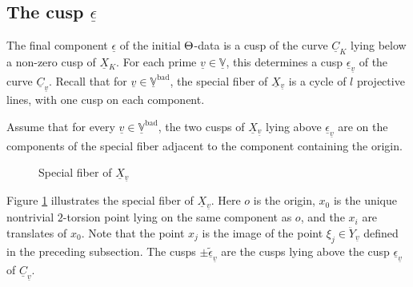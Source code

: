 \documentclass[12pt, reqno, a4paper]{amsart}
\def\udl#1{\underline{#1}} %
\def\bV{\mathbb{V}}
\def\uX{\udl{X}} %
\def\uC{\udl{C}} %
\def\uV{\udl{\bV}} %
\def\uv{\udl{v}} %
\def\ep{\epsilon} %
\def\uep{\udl{\ep}} %
\def\bad{\mathrm{bad}}
\begin{document}
\subsection{The cusp \(\uep\)}
The final component $\uep$ of the initial $\Th$-data is a cusp of the curve $\uC_K$ lying below a non-zero cusp of $\uX{}_K$. For each prime $\uv\in \uV$, this determines a cusp $\uep_{\uv}$ of the curve $\uC_{\uv}$.
Recall that for $\uv\in\uV^{\bad}$, the special fiber of $\uX{}_{\uv}$ is a cycle of $l$ projective lines, with one cusp on each component.
\begin{assum}
    Assume that for every $\uv\in \uV^{\bad}$, the two cusps of $\uX{}_{\uv}$ lying above $\uep_{\uv}$ are on the components of the special fiber adjacent to the component containing the origin.
\end{assum}
\begin{figure}[ht]
\begin{center}
\caption{Special fiber of $\uX{}_{\uv}$}
\label{fig:SpecialFiberOfuuX}
\end{center}
\end{figure}

Figure \ref{fig:SpecialFiberOfuuX} illustrates the special fiber of $\uX{}_{\uv}$.
Here $o$ is the origin, $x_0$ is the unique nontrivial $2$-torsion point lying on the same component as $o$, and the $x_i$ are translates of $x_0$.
Note that the point $x_j$ is the image of the point $\xi_j\in \ddot{Y}_{\uv}$ defined in the preceding subsection.
The cusps $\pm \widetilde{\uep}_{\uv}$ are the cusps lying above the cusp $\uep_{\uv}$ of $\uC_{\uv}$.


\setcounter{equation}{0}
\end{document}

